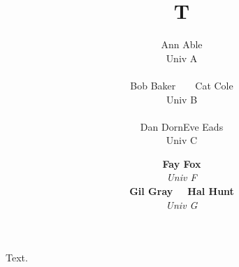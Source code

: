 \documentclass{article}
\title{T}
\author{Ann Able \\
Univ A \\
\\
Bob Baker~~~~Cat Cole \\
Univ B \\
\vspace{4pt} \\
Dan Dorn\;\;Eve Eads \\
Univ C
\and {\bf Fay Fox} \\
{\it Univ F} \\
{\bf Gil Gray}~~~{\bf Hal Hunt} \\
{\it Univ G}}
\begin{document}
\maketitle
Text.
\end{document}
